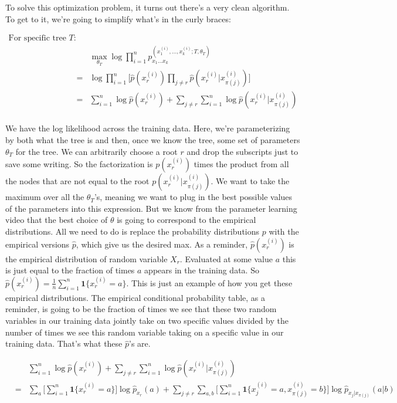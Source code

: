 To solve this optimization problem, it turns out there's a very clean algorithm. To get to it, we're going to simplify what's in the curly braces:

\begin{eqnarray*}
\text{For specific tree } T: \\
& & \max_{\theta_T} \log \prod_{i=1}^n p_{x_1 \dots x_k}^{(x_1^{(i)},\dots ,x_k^{(i)}; T, \theta_T)}  \\&=& \log \prod_{i=1}^n \bigg[ \widehat{p}(x_r^{(i)}) \prod_{j \ne r} \widehat{p}(x_r^{(i)} | x_{\pi(j)}^{(i)}) \bigg] \\
&=& \sum_{i=1}^n \log \widehat{p}(x_r^{(i)}) + \sum_{j \ne r} \sum_{i=1}^n \log \widehat{p}(x_r^{(i)} | x_{\pi(j)}^{(i)}) \\
\end{eqnarray*}

We have the log likelihood across the training data. Here, we're parameterizing by both what the tree is and then, once we know the tree, some set of parameters $\theta_T$ for the tree. We can arbitrarily choose a root $r$ and drop the subscripts just to save some writing. So the factorization is $p(x_r^{(i)})$ times the product from all the nodes that are not equal to the root $p(x_r^{(i)} | x_{\pi(j)}^{(i)})$. We want to take the maximum over all the $\theta_T$'s, meaning we want to plug in the best possible values of the parameters into this expression. But we know from the parameter learning video that the best choice of $\theta$ is going to correspond to the empirical distributions. All we need to do is replace the probability distributions $p$ with the empirical versions $\widehat{p}$, which give us the desired max. As a reminder, $\widehat{p}(x_r^{(i)})$ is the empirical distribution of random variable $X_r$. Evaluated at some value $a$ this is just equal to the fraction of times $a$ appears in the training data. So $\widehat{p}(x_r^{(i)}) = \frac{1}{n} \sum_{i=1}^n \mathbf{1} \{x_r^{(i)}=a\}$. This is just an example of how you get these empirical distributions. The empirical conditional probability table, as a reminder, is going to be the fraction of times we see that these two random variables in our training data jointly take on two specific values divided by the number of times we see this random variable taking on a specific value in our training data. That's what these $\widehat{p}$'s are. 

\begin{eqnarray*}
& & \sum_{i=1}^n \log \widehat{p}(x_r^{(i)}) + \sum_{j \ne r} \sum_{i=1}^n \log \widehat{p}(x_r^{(i)} | x_{\pi(j)}^{(i)}) \\
&=& \sum_a \bigg[ \sum_{i=1}^n \mathbf{1} \{ x_r^{(i)} = a\} \bigg] \log \widehat{p}_{x_r} (a) + \sum_{j \ne r} \sum_{a,b} \bigg[ \sum_{i=1}^n \mathbf{1} \{ x_j^{(i)} = a, x_{\pi(j)}^{(i)} = b \} \bigg] \log \widehat{p}_{x_j | x_{\pi(j)}} (a|b) 
\end{eqnarray*}

